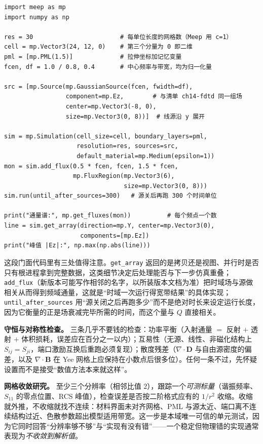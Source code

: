 \documentclass[12pt,a4paper,fontset=fandol]{ctexbook}
\newcommand{\Tp}[1]{\texttt{#1}}
\newcommand{\Bk}{\allowbreak}
\begin{document}
\begin{lstlisting}[style=pythonstyle,label={lst:ch14-meep},caption={Meep 的 Python 门面：分辨率、线源、PML 与通量监视}]
import meep as mp
import numpy as np

res = 30                        # 每单位长度的网格数（Meep 用 c=1）
cell = mp.Vector3(24, 12, 0)    # 第三个分量为 0 即二维
pml = [mp.PML(1.5)]             # 拉伸坐标加记忆变量
fcen, df = 1.0 / 0.8, 0.4       # 中心频率与带宽，均为归一化量

src = [mp.Source(mp.GaussianSource(fcen, fwidth=df),
                 component=mp.Ez,        # 与清单 ch14-fdtd 同一组场
                 center=mp.Vector3(-8, 0),
                 size=mp.Vector3(0, 8))]  # 线源沿 y 展开

sim = mp.Simulation(cell_size=cell, boundary_layers=pml,
                    resolution=res, sources=src,
                    default_material=mp.Medium(epsilon=1))
mon = sim.add_flux(0.5 * fcen, fcen, 1.5 * fcen,
                   mp.FluxRegion(mp.Vector3(6),
                                 size=mp.Vector3(0, 8)))
sim.run(until_after_sources=300)   # 源关后再跑 300 个时间单位

print("通量谱:", mp.get_fluxes(mon))          # 每个频点一个数
line = sim.get_array(direction=mp.Y, center=mp.Vector3(0),
                     components=[mp.Ez])
print("峰值 |Ez|:", np.max(np.abs(line)))
\end{lstlisting}

这段门面代码里有三处值得注意。\Tp{get\_array} \Bk{} 返回的是拷贝还是视图、并行时是否只有根进程拿到完整数据，这类细节决定后处理能否与下一步仿真重叠；\Tp{add\_flux}（新版本可能写作相邻的名字，以所装版本文档为准）把时域场与源做相关从而得到频域通量，这就是``时域一次运行得宽带结果''的具体实现；\Tp{until\_after\_sources} 用``源关闭之后再跑多少''而不是绝对时长来设定运行长度，因为它衡量的正是场衰减完毕所需的时间，而这个量与 $Q$ 直接相关。

\textbf{守恒与对称性检查。} 三条几乎不要钱的检查：功率平衡（入射通量 $=$ 反射 $+$ 透射 $+$ 体积损耗，误差应在百分之一以内）；互易性（无源、线性、非磁化结构上 $S_{ij} = S_{ji}$，端口激励互换后重跑必须复现）；散度残差（$\nabla \cdot \mathbf{D}$ 与自由源密度的偏差，以及 $\nabla \cdot \mathbf{B}$ 在 Yee 网格上应保持在小数点后很多位）。任何一条不过，先怀疑设置而不是接受``数值方法本来就这样''。

\textbf{网格收敛研究。} 至少三个分辨率（相邻比值 $2$），跟踪一个\emph{可测标量}（谐振频率、$S_{11}$ 的零点位置、RCS 峰值），检查误差是否按二阶格式应有的 $1/r^{2}$ 收缩。收缩就外推，不收缩就找不连续：材料界面未对齐网格、PML 与源太近、端口离不连续结构过近、色散参数超出模型适用带宽。这一步是本域唯一可信的单元测试，因为它同时回答``分辨率够不够''与``实现有没有错''——一个稳定但物理错的实现通常表现为\emph{不收敛到解析值}。
\end{document}
